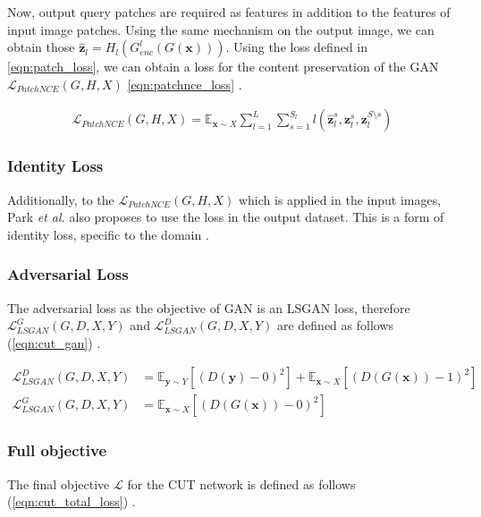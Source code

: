 \documentclass[a4paper,11pt, DIV=12]{scrartcl}
\newcommand{\x}{\boldsymbol{x}}
\newcommand{\y}{\boldsymbol{y}}
\begin{document}
Now, output query patches are required as features in addition to the features of input image patches. Using the same mechanism on the output image, we can obtain those
$\boldsymbol{\hat{z}}_l = H_l(G_{enc}^l(G(\x)))$. Using the loss defined in \autoref{eqn:patch_loss}, we can obtain a loss for the content preservation of the
GAN $\mathcal{L}_{PatchNCE}(G,H,X)$ \autoref{eqn:patchnce_loss} \cite{cut}.

\begin{equation}
   \label{eqn:patchnce_loss}
   \begin{aligned}
      \mathcal{L}_{PatchNCE}(G,H,X) = \mathbb{E}_{\x \sim X} \sum_{l = 1}^L \sum_{s=1}^{S_l} l(\boldsymbol{\hat{z}}_l^s, \boldsymbol{z}_l^s, \boldsymbol{z}_l^{S \setminus s})
   \end{aligned}
\end{equation}

\subsubsection*{Identity Loss}
Additionally, to the $\mathcal{L}_{PatchNCE}(G, H, X)$ which is applied in the input images, Park \textit{et al.} also proposes to use the loss in the output dataset.
This is a form of identity loss, specific to the domain \cite{cut}.

\subsubsection*{Adversarial Loss}
The adversarial loss as the objective of GAN is an LSGAN loss, therefore $\mathcal{L}_{LSGAN}^G(G, D, X, Y)$ and $\mathcal{L}_{LSGAN}^D(G, D, X, Y)$ are defined
as follows (\autoref{eqn:cut_gan}) \cite{cut}.

\begin{equation}
   \label{eqn:cut_gan}
   \begin{aligned}
      \mathcal{L}_{LSGAN}^D(G, D, X, Y) & = \mathbb{E}_{\y \sim Y}\left[(D(\y) - 0)^2\right] + \mathbb{E}_{\x \sim X}\left[(D(G(\x)) - 1)^2\right] \\
      \mathcal{L}_{LSGAN}^G(G, D, X, Y) & = \mathbb{E}_{\x \sim X}\left[(D(G(\x)) - 0)^2\right]
   \end{aligned}
\end{equation}

\subsubsection*{Full objective}
The final objective $\mathcal{L}$ for the CUT network is defined as follows (\autoref{eqn:cut_total_loss}) \cite{cut}.
\end{document}
